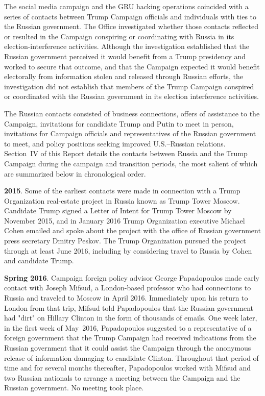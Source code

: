 The social media campaign and the GRU hacking operations coincided with a series of contacts between Trump Campaign officials and individuals with ties to the Russian government.
The Office investigated whether those contacts reflected or resulted in the Campaign conspiring or coordinating with Russia in its election-interference activities.
Although the investigation established that the Russian government perceived it would benefit from a Trump presidency and worked to secure that outcome, and that the Campaign expected it would benefit electorally from information stolen and released through Russian efforts, the investigation did not establish that members of the Trump Campaign conspired or coordinated with the Russian government in its election interference activities.

The Russian contacts consisted of business connections, offers of assistance to the Campaign, invitations for candidate Trump and Putin to meet in person, invitations for Campaign officials and representatives of the Russian government to meet, and policy positions seeking improved U.S.--Russian relations.
Section~IV of this Report details the contacts between Russia and the Trump Campaign during the campaign and transition periods, the most salient of which are summarized below in chronological order.

\textbf{2015}.
Some of the earliest contacts were made in connection with a Trump Organization real-estate project in Russia known as Trump Tower Moscow.
Candidate Trump signed a Letter of Intent for Trump Tower Moscow by November 2015, and in January 2016 Trump Organization executive Michael Cohen emailed and spoke about the project with the office of Russian government press secretary Dmitry Peskov.
The Trump Organization pursued the project through at least June 2016, including by considering travel to Russia by Cohen and candidate Trump.

\textbf{Spring 2016}.
Campaign foreign policy advisor George Papadopoulos made early contact with Joseph Mifsud, a London-based professor who had connections to Russia and traveled to Moscow in April 2016.
Immediately upon his return to London from that trip, Mifsud told Papadopoulos that the Russian government had "dirt" on Hillary Clinton in the form of thousands of emails.
One week later, in the first week of May~2016, Papadopoulos suggested to a representative of a foreign government that the Trump Campaign had received indications from the Russian government that it could assist the Campaign through the anonymous release of information damaging to candidate Clinton.
Throughout that period of time and for several months thereafter, Papadopoulos worked with Mifsud and two Russian nationals to arrange a meeting between the Campaign and the Russian government.
No meeting took place.

